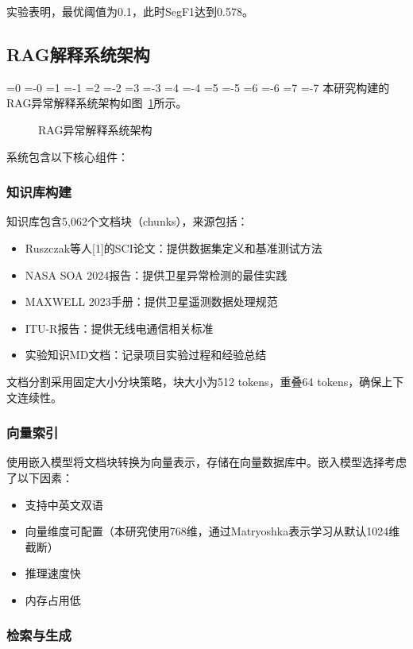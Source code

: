 \documentclass[12pt, a4paper]{article}
\newcommand{\zihao}[1]{%
    \ifnum#1=0 {\fontsize{42pt}{50pt}\selectfont}%
    \else\ifnum#1=-0 {\fontsize{36pt}{44pt}\selectfont}%
    \else\ifnum#1=1 {\fontsize{26pt}{32pt}\selectfont}%
    \else\ifnum#1=-1 {\fontsize{24pt}{28pt}\selectfont}%
    \else\ifnum#1=2 {\fontsize{22pt}{26pt}\selectfont}%
    \else\ifnum#1=-2 {\fontsize{18pt}{22pt}\selectfont}%
    \else\ifnum#1=3 {\fontsize{16pt}{20pt}\selectfont}%
    \else\ifnum#1=-3 {\fontsize{15pt}{18pt}\selectfont}%
    \else\ifnum#1=4 {\fontsize{14pt}{17pt}\selectfont}%
    \else\ifnum#1=-4 {\fontsize{12pt}{15pt}\selectfont}%
    \else\ifnum#1=5 {\fontsize{10.5pt}{13pt}\selectfont}%
    \else\ifnum#1=-5 {\fontsize{9pt}{11pt}\selectfont}%
    \else\ifnum#1=6 {\fontsize{7.5pt}{9pt}\selectfont}%
    \else\ifnum#1=-6 {\fontsize{6.5pt}{8pt}\selectfont}%
    \else\ifnum#1=7 {\fontsize{5.5pt}{7pt}\selectfont}%
    \else\ifnum#1=-7 {\fontsize{5pt}{6pt}\selectfont}%
    \fi\fi\fi\fi\fi\fi\fi\fi\fi\fi\fi\fi\fi\fi\fi\fi
}
\newcommand{\songti}{\CJKfontspec{SimSun}}
\begin{document}
实验表明，最优阈值为0.1，此时SegF1达到0.578。

\subsection{RAG解释系统架构}

\zihao{5}\songti
本研究构建的RAG异常解释系统架构如图~\ref{fig:rag}所示。

\begin{figure}[H]
\centering
{}
\caption{RAG异常解释系统架构}
\label{fig:rag}
\end{figure}

系统包含以下核心组件：

\subsubsection{知识库构建}

知识库包含5,062个文档块（chunks），来源包括：
\begin{itemize}
    \item Ruszczak等人[1]的SCI论文：提供数据集定义和基准测试方法
    \item NASA SOA 2024报告：提供卫星异常检测的最佳实践
    \item MAXWELL 2023手册：提供卫星遥测数据处理规范
    \item ITU-R报告：提供无线电通信相关标准
    \item 实验知识MD文档：记录项目实验过程和经验总结
\end{itemize}

文档分割采用固定大小分块策略，块大小为512 tokens，重叠64 tokens，确保上下文连续性。

\subsubsection{向量索引}

使用嵌入模型将文档块转换为向量表示，存储在向量数据库中。嵌入模型选择考虑了以下因素：
\begin{itemize}
    \item 支持中英文双语
    \item 向量维度可配置（本研究使用768维，通过Matryoshka表示学习从默认1024维截断）
    \item 推理速度快
    \item 内存占用低
\end{itemize}

\subsubsection{检索与生成}
\end{document}
